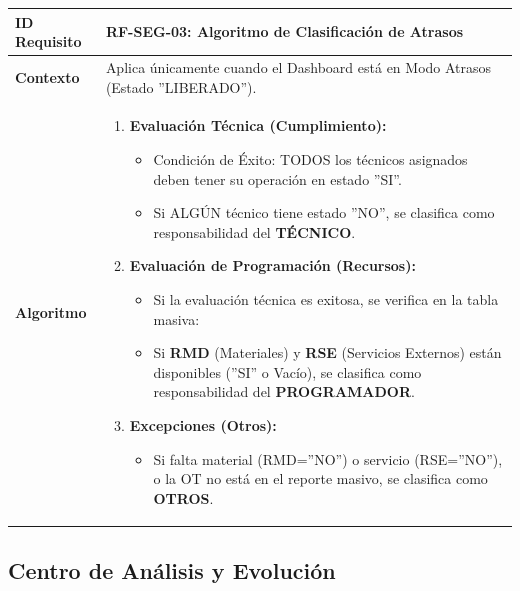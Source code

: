 \documentclass[11pt, letterpaper]{article}
\begin{document}
\begin{longtable}{|p{3.5cm}|p{11.5cm}|}
\hline
\rowcolor{headergray} \textbf{ID Requisito} & \textbf{RF-SEG-03: Algoritmo de Clasificación de Atrasos} \\ \hline
\textbf{Contexto} & Aplica únicamente cuando el Dashboard está en Modo Atrasos (Estado ''LIBERADO''). \\ \hline
\textbf{Algoritmo} & 
\begin{enumerate}
    \item \textbf{Evaluación Técnica (Cumplimiento):}
    \begin{itemize}
        \item Condición de Éxito: TODOS los técnicos asignados deben tener su operación en estado ''SI''.
        \item Si ALGÚN técnico tiene estado ''NO'', se clasifica como responsabilidad del \textbf{TÉCNICO}.
    \end{itemize}
    \item \textbf{Evaluación de Programación (Recursos):}
    \begin{itemize}
        \item Si la evaluación técnica es exitosa, se verifica en la tabla masiva:
        \item Si \textbf{RMD} (Materiales) y \textbf{RSE} (Servicios Externos) están disponibles (''SI'' o Vacío), se clasifica como responsabilidad del \textbf{PROGRAMADOR}.
    \end{itemize}
    \item \textbf{Excepciones (Otros):}
    \begin{itemize}
        \item Si falta material (RMD=''NO'') o servicio (RSE=''NO''), o la OT no está en el reporte masivo, se clasifica como \textbf{OTROS}.
    \end{itemize}
\end{enumerate} \\ \hline
\end{longtable}

\subsection{Centro de Análisis y Evolución}
\end{document}

